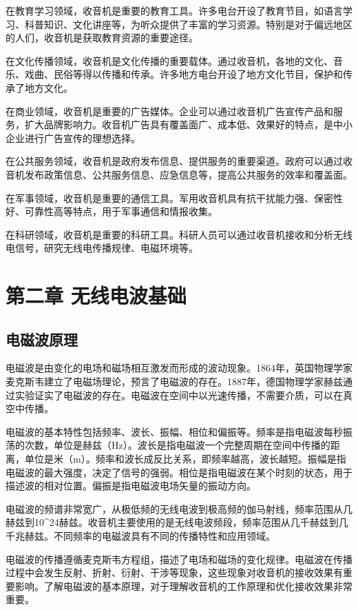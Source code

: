 \documentclass[12pt,UTF8]{ctexbook}
\begin{document}
在教育学习领域，收音机是重要的教育工具。许多电台开设了教育节目，如语言学习、科普知识、文化讲座等，为听众提供了丰富的学习资源。特别是对于偏远地区的人们，收音机是获取教育资源的重要途径。

在文化传播领域，收音机是文化传播的重要载体。通过收音机，各地的文化、音乐、戏曲、民俗等得以传播和传承。许多地方电台开设了地方文化节目，保护和传承了地方文化。

在商业领域，收音机是重要的广告媒体。企业可以通过收音机广告宣传产品和服务，扩大品牌影响力。收音机广告具有覆盖面广、成本低、效果好的特点，是中小企业进行广告宣传的理想选择。

在公共服务领域，收音机是政府发布信息、提供服务的重要渠道。政府可以通过收音机发布政策信息、公共服务信息、应急信息等，提高公共服务的效率和覆盖面。

在军事领域，收音机是重要的通信工具。军用收音机具有抗干扰能力强、保密性好、可靠性高等特点，用于军事通信和情报收集。

在科研领域，收音机是重要的科研工具。科研人员可以通过收音机接收和分析无线电信号，研究无线电传播规律、电磁环境等。

\chapter{第二章 无线电波基础}

\section{电磁波原理}

电磁波是由变化的电场和磁场相互激发而形成的波动现象。1864年，英国物理学家麦克斯韦建立了电磁场理论，预言了电磁波的存在。1887年，德国物理学家赫兹通过实验证实了电磁波的存在。电磁波在空间中以光速传播，不需要介质，可以在真空中传播。

电磁波的基本特性包括频率、波长、振幅、相位和偏振等。频率是指电磁波每秒振荡的次数，单位是赫兹（Hz）。波长是指电磁波一个完整周期在空间中传播的距离，单位是米（m）。频率和波长成反比关系，即频率越高，波长越短。振幅是指电磁波的最大强度，决定了信号的强弱。相位是指电磁波在某个时刻的状态，用于描述波的相对位置。偏振是指电磁波电场矢量的振动方向。

电磁波的频谱非常宽广，从极低频的无线电波到极高频的伽马射线，频率范围从几赫兹到10^24赫兹。收音机主要使用的是无线电波频段，频率范围从几千赫兹到几千兆赫兹。不同频率的电磁波具有不同的传播特性和应用领域。

电磁波的传播遵循麦克斯韦方程组，描述了电场和磁场的变化规律。电磁波在传播过程中会发生反射、折射、衍射、干涉等现象，这些现象对收音机的接收效果有重要影响。了解电磁波的基本原理，对于理解收音机的工作原理和优化接收效果非常重要。
\end{document}
